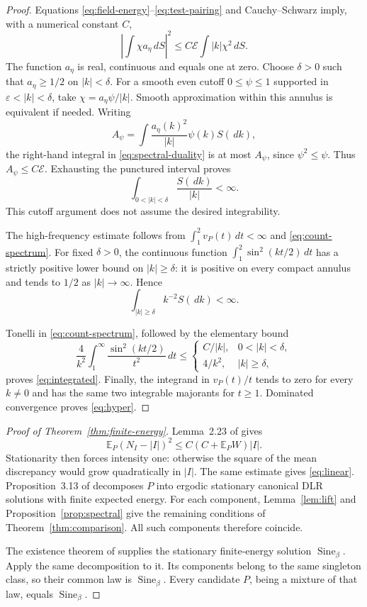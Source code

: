 \documentclass[11pt,reqno]{amsart}
\numberwithin{equation}{section}
\theoremstyle{definition}
\theoremstyle{remark}
\newcommand{\E}{\mathbb E}
\newcommand{\1}{\mathbf 1}
\newcommand{\Sine}{\operatorname{Sine}}
\newcommand{\dd}{\,d}
\newcommand{\calE}{\mathcal E}
\newcommand{\abs}[1]{\left\lvert #1\right\rvert}
\begin{document}
\begin{proof}
Equations \eqref{eq:field-energy}--\eqref{eq:test-pairing} and
Cauchy--Schwarz imply, with a numerical constant $C$,
\begin{equation}\label{eq:spectral-duality}
\abs{\int\chi a_\eta\dd S}^2
\le C\calE\int |k|\chi^2\dd S.
\end{equation}
The function $a_\eta$ is real, continuous and equals one at zero.
Choose $\delta>0$ such that $a_\eta\ge1/2$ on $|k|<\delta$.
For a smooth even cutoff $0\le\psi\le1$ supported in
$\varepsilon<|k|<\delta$, take
$\chi=a_\eta\psi/|k|$. Smooth approximation within this annulus is
equivalent if needed. Writing
\[
A_\psi=\int\frac{a_\eta(k)^2}{|k|}\psi(k)S(\dd k),
\]
the right-hand integral in \eqref{eq:spectral-duality} is at most
$A_\psi$, since $\psi^2\le\psi$. Thus $A_\psi\le C\calE$.
Exhausting the punctured interval proves
\begin{equation}\label{eq:low-frequency}
\int_{0<|k|<\delta}\frac{S(\dd k)}{|k|}<\infty.
\end{equation}
This cutoff argument does not assume the desired integrability.

The high-frequency estimate follows from
$\int_1^2v_P(t)\dd t<\infty$ and \eqref{eq:count-spectrum}.
For fixed $\delta>0$, the continuous function
$\int_1^2\sin^2(kt/2)\dd t$ has a strictly positive lower bound on
$|k|\ge\delta$: it is positive on every compact annulus and tends
to $1/2$ as $|k|\to\infty$. Hence
\begin{equation}\label{eq:high-frequency}
\int_{|k|\ge\delta}k^{-2}S(\dd k)<\infty.
\end{equation}

Tonelli in \eqref{eq:count-spectrum}, followed by the elementary bound
\[
\frac4{k^2}\int_1^\infty\frac{\sin^2(kt/2)}{t^2}\dd t
\le
\begin{cases}
C/|k|,&0<|k|<\delta,\\
4/k^2,&|k|\ge\delta,
\end{cases}
\]
proves \eqref{eq:integrated}. Finally, the integrand in
$v_P(t)/t$ tends to zero for every $k\ne0$ and has the same two
integrable majorants for $t\ge1$. Dominated convergence proves
\eqref{eq:hyper}.
\end{proof}

\begin{proof}[Proof of Theorem~\ref{thm:finite-energy}]
Lemma~2.23 of \cite{DHLM} gives
\[
\E_P(N_I-|I|)^2\le C(C+\E_PW)|I|.
\]
Stationarity then forces intensity one: otherwise the square of the
mean discrepancy would grow quadratically in $|I|$. The same estimate
gives \eqref{eq:linear}.
Proposition~3.13 of \cite{DHLM} decomposes $P$ into ergodic stationary
canonical DLR solutions with finite expected energy. For each component,
Lemma~\ref{lem:lift} and Proposition~\ref{prop:spectral} give the remaining
conditions of Theorem~\ref{thm:comparison}. All such components therefore
coincide.

The existence theorem of \cite{DHLM} supplies the stationary finite-energy
solution $\Sine_\beta$. Apply the same decomposition to it. Its
components belong to the same singleton class, so their common law is
$\Sine_\beta$. Every candidate $P$, being a mixture of that law, equals
$\Sine_\beta$.
\end{proof}
\end{document}
